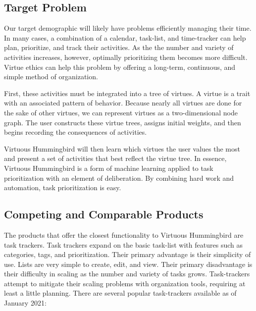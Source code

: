 \documentclass{article}
\begin{document}
\subsection{Target Problem}

Our target demographic will likely have problems efficiently managing their time.
In many cases, a combination of a calendar, task-list, and time-tracker can help plan, prioritize, and track their activities.
As the the number and variety of activities increases, however, optimally prioritizing them becomes more difficult.
Virtue ethics can help this problem by offering a long-term, continuous, and simple method of organization.

First, these activities must be integrated into a tree of virtues.
A virtue is a trait with an associated pattern of behavior.
Because nearly all virtues are done for the sake of other virtues, we can represent virtues as a two-dimensional node graph.
The user constructs these virtue trees, assigns initial weights, and then begins recording the consequences of activities.

Virtuous Hummingbird will then learn which virtues the user values the most and present a set of activities that best reflect the virtue tree.
In essence, Virtuous Hummingbird is a form of machine learning applied to task prioritization with an element of deliberation.
By combining hard work and automation, task prioritization is easy.

\subsection{Competing and Comparable Products}

The products that offer the closest functionality to Virtuous Hummingbird are task trackers.
Task trackers expand on the basic task-list with features such as categories, tags, and prioritization.
Their primary advantage is their simplicity of use.
Lists are very simple to create, edit, and view.
Their primary disadvantage is their difficulty in scaling as the number and variety of tasks grows.
Task-trackers attempt to mitigate their scaling problems with organization tools, requiring at least a little planning.
There are several popular task-trackers available as of January 2021:
\end{document}

